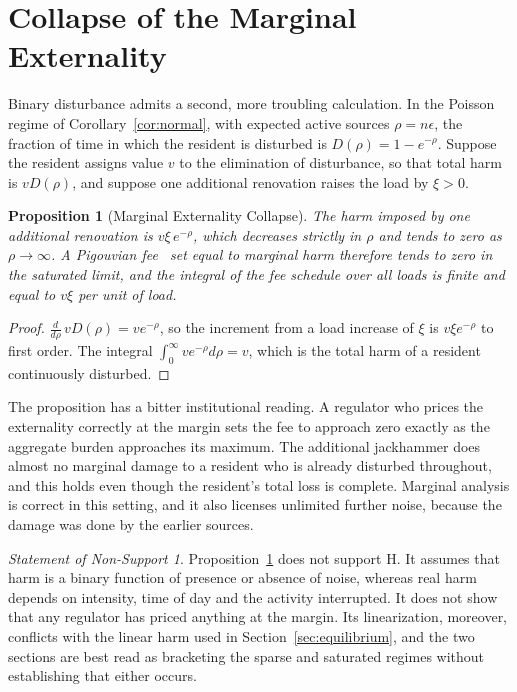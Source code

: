 \documentclass[11pt]{article}
\newtheorem{proposition}[theorem]{Proposition}
\theoremstyle{definition}
\theoremstyle{remark}
\newtheorem{nonsupport}{Statement of Non-Support}
\begin{document}
\section{Collapse of the Marginal Externality}\label{sec:collapse}

Binary disturbance admits a second, more troubling calculation. In the Poisson regime of Corollary~\ref{cor:normal}, with expected active sources $\rho = n\epsilon$, the fraction of time in which the resident is disturbed is $D(\rho) = 1-e^{-\rho}$. Suppose the resident assigns value $v$ to the elimination of disturbance, so that total harm is $vD(\rho)$, and suppose one additional renovation raises the load by $\xi>0$.

\begin{proposition}[Marginal Externality Collapse]\label{prop:collapse}
The harm imposed by one additional renovation is $v\xi\,e^{-\rho}$, which decreases strictly in $\rho$ and tends to zero as $\rho\to\infty$. A Pigouvian fee~\cite{pigou} set equal to marginal harm therefore tends to zero in the saturated limit, and the integral of the fee schedule over all loads is finite and equal to $v\xi$ per unit of load.
\end{proposition}

\begin{proof}
$\frac{d}{d\rho}\,vD(\rho) = ve^{-\rho}$, so the increment from a load increase of $\xi$ is $v\xi e^{-\rho}$ to first order. The integral $\int_0^\infty ve^{-\rho}d\rho = v$, which is the total harm of a resident continuously disturbed.
\end{proof}

The proposition has a bitter institutional reading. A regulator who prices the externality correctly at the margin sets the fee to approach zero exactly as the aggregate burden approaches its maximum. The additional jackhammer does almost no marginal damage to a resident who is already disturbed throughout, and this holds even though the resident's total loss is complete. Marginal analysis is correct in this setting, and it also licenses unlimited further noise, because the damage was done by the earlier sources.

\begin{nonsupport}\label{ns:collapse}
Proposition~\ref{prop:collapse} does not support H. It assumes that harm is a binary function of presence or absence of noise, whereas real harm depends on intensity, time of day and the activity interrupted. It does not show that any regulator has priced anything at the margin. Its linearization, moreover, conflicts with the linear harm used in Section~\ref{sec:equilibrium}, and the two sections are best read as bracketing the sparse and saturated regimes without establishing that either occurs.
\end{nonsupport}
\end{document}
